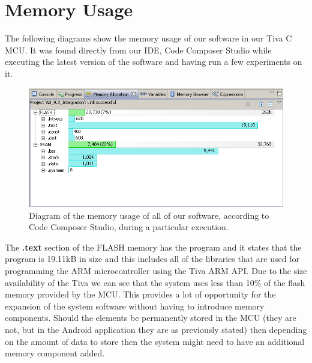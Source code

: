 \section{Memory Usage}
	
	The following diagrams show the memory usage of our software in our Tiva C MCU. It was found directly from our IDE, Code Composer Studio while executing the latest version of the software and having run a few experiments on it.
	
	\begin{figure}[H]
			\centering
				\includegraphics[scale=0.5]{img/memoryUsage}
			\caption{Diagram of the memory usage of all of our software, according to Code Composer Studio, during a particular execution.}
		\end{figure}

	The \textbf{.text} section of the FLASH memory has the program and it states that the program is 19.11kB in size and this includes all of the libraries that are used for programming the ARM microcontroller using the Tiva ARM API. Due to the size availability of the Tiva we can see that the system uses less than 10\% of the flash memory provided by the MCU. This provides a lot of opportunity for the expansion of the system software without having to introduce memory components. Should the elements be permanently stored in the MCU (they are not, but in the Android application they are as previously stated) then depending on the amount of data to store then the system might need to have an additional memory component added.


